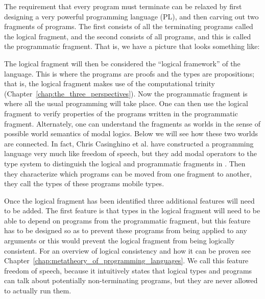 

\renewcommand{\FSdrulename}[1]{\textsc{\scriptsize #1}}

\newcommand{\tvdash}[1]{\vdash^{#1}}
\newcommand{\arrowT}[5]{(#1 :^{#2} #3)^{#4} \to #5}
\newcommand{\rec}[3]{rec\ #1\ #2\ #3}
\newcommand{\recc}[3]{rec^{-}\ #1\ #3}

The requirement that every program must terminate can be relaxed by
first designing a very powerful programming language (PL), and then
carving out two fragments of programs. The first consists of all the
terminating programs called the logical fragment, and the second
consists of all programs, and this is called the programmatic
fragment. That is, we have a picture that looks something like:
\begin{center}
\end{center}
The logical fragment will then be considered the ``logical framework''
of the language. This is where the programs are proofs and the types
are propositions; that is, the logical fragment makes use of the
computational trinity (Chapter~\ref{chap:the_three_perspectives}).
Now the programmatic fragment is where all the usual programming will
take place. One can then use the logical fragment to verify properties
of the programs written in the programmatic fragment.  Alternately,
one can understand the fragments as worlds in the sense of possible
world semantics of modal logics.  Below we will see how these two
worlds are connected.  In fact, Chris Casinghino et al. have
constructed a programming language very much like freedom of speech,
but they add modal operators to the type system to distinguish the
logical and programmatic fragments in \cite{Casinghino:2012,
  ccasin:popl14}.  Then they characterize which programs can be moved
from one fragment to another, they call the types of these programs
mobile types.

Once the logical fragment has been identified three additional
features will need to be added.  The first feature is that types in
the logical fragment will need to be able to depend on programs from
the programmatic fragment, but this feature has to be designed so as
to prevent these programs from being applied to any arguments or this
would prevent the logical fragment from being logically consistent.
For an overview of logical consistency and how it can be proven see
Chapter~\ref{chap:metatheory_of_programming_languages}.  We call this
feature freedom of speech, because it intuitively states that logical
types and programs can talk about potentially non-terminating
programs, but they are never allowed to actually run them.

